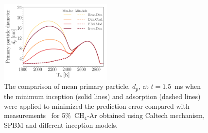 \begin{figure}[H]
	\centering
	\includegraphics[width=0.5\textwidth]{Figures/Results/Shocktube/Agafonov2016_cpr/d_p_maxincads_combined.pdf}
	\caption{The comparison of mean primary particle, $d_p$, at $t=1.5$~ms when the minimum inception (solid lines) and adsorption (dashed lines) were applied to minimized the prediction error compared with measurements~\citep{agafonov2016unified} for 5\%~$\mathrm{CH_4}$-Ar obtained using Caltech mechanism, SPBM and different inception models.}
	\label{fig:shockagof_dp_maxincads_cpr} 
\end{figure}





